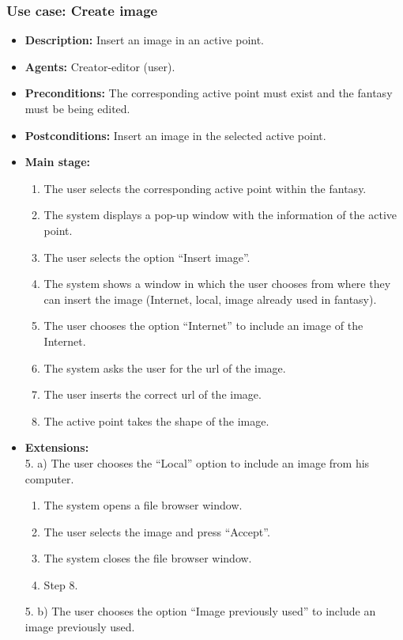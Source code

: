 \subsubsection{Use case: Create image}
\begin{itemize}
	\item \textbf{Description:} Insert an image in an active point.
	\item \textbf{Agents:} Creator-editor (user).
	\item \textbf{Preconditions:} The corresponding active point must exist and the fantasy must be being edited.
	\item \textbf{Postconditions:} Insert an image in the selected active point.
	\item \textbf{Main stage:}
	\begin{enumerate}
		\item The user selects the corresponding active point within the fantasy.
		\item The system displays a pop-up window with the information of the active point.
		\item The user selects the option ``Insert image''.
		\item The system shows a window in which the user chooses from where they can insert the image (Internet, local, image already used in fantasy).
		\item The user chooses the option ``Internet'' to include an image of the Internet.
		\item The system asks the user for the url of the image.
		\item The user inserts the correct url of the image.
		\item The active point takes the shape of the image.
	\end{enumerate}
	\item \textbf{Extensions:} \\5. a) The user chooses the ``Local'' option to include an image from his computer.
	\begin{enumerate}
		\item The system opens a file browser window.
		\item The user selects the image and press ``Accept''.
		\item The system closes the file browser window.
		\item Step 8.
	\end{enumerate}
	5. b) The user chooses the option ``Image previously used'' to include an image previously used.
	\begin{enumerate}

\end{enumerate}
\end{itemize}

